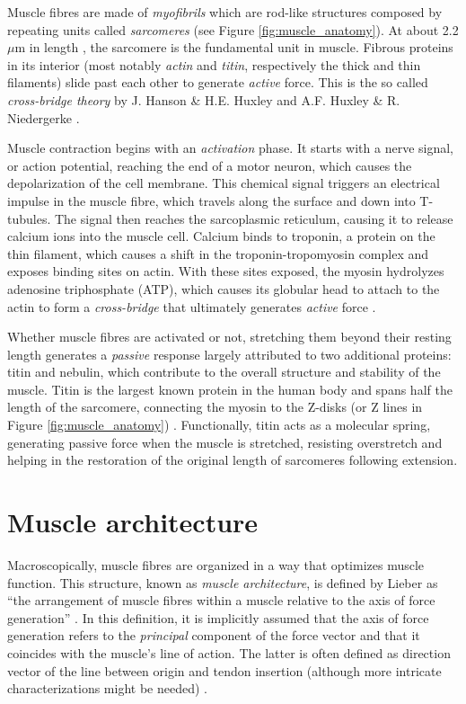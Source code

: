 \documentclass{sfuthesis}
\numberwithin{equation}{section}
\numberwithin{figure}{chapter}
\numberwithin{table}{chapter}
\theoremstyle{definition}
\begin{document}
Muscle fibres are made of \textit{myofibrils} which are rod-like structures composed by repeating units called \textit{sarcomeres} (see Figure \ref{fig:muscle_anatomy}). At about 2.2 $\mu$m in length \cite{burkholder2001sarcomere}, the sarcomere is the fundamental unit in muscle. Fibrous proteins in its interior (most notably \textit{actin} and \textit{titin}, respectively the thick and thin filaments) slide past each other to generate \textit{active} force. This is the so called \textit{cross-bridge theory} by J. Hanson \& H.E. Huxley \cite{HansonHuxley1953} and A.F. Huxley \& R. Niedergerke \cite{HuxleyNiedergerke1954}.

Muscle contraction begins with an \textit{activation} phase. It starts with a nerve signal, or action potential, reaching the end of a motor neuron, which causes the depolarization of the cell membrane. This chemical signal triggers an electrical impulse in the muscle fibre, which travels along the surface and down into T-tubules. The signal then reaches the sarcoplasmic reticulum, causing it to release calcium ions into the muscle cell. Calcium binds to troponin, a protein on the thin filament, which causes a shift in the troponin-tropomyosin complex and exposes binding sites on actin. With these sites exposed, the myosin hydrolyzes adenosine triphosphate (ATP), which causes its globular head to attach to the actin to form a \textit{cross-bridge} that ultimately generates \textit{active} force \cite{Ruegg2012Calcium}.

Whether muscle fibres are activated or not, stretching them beyond their resting length generates a \textit{passive} response largely attributed to two additional proteins: titin and nebulin, which contribute to the overall structure and stability of the muscle. Titin is the largest known protein in the human body and spans half the length of the sarcomere, connecting the myosin to the Z-disks (or Z lines in Figure \ref{fig:muscle_anatomy}) \cite{Nishikawa2020, Nishikawa2012WindingFilament}. Functionally, titin acts as a molecular spring, generating passive force when the muscle is stretched, resisting overstretch and helping in the restoration of the original length of sarcomeres following extension.

\section{Muscle architecture} \label{sec:intro_muscle_architecture}

Macroscopically, muscle fibres are organized in a way that optimizes muscle function. This structure, known as \textit{muscle architecture}, is defined by Lieber as ``the arrangement of muscle fibres within a muscle relative to the axis of force generation'' \cite{Lieber2010Book}. In this definition, it is implicitly assumed that the axis of force generation refers to the \textit{principal} component of the force vector and that it coincides with the muscle's line of action. The latter is often defined as direction vector of the line between origin and tendon insertion (although more intricate characterizations might be needed) \cite{Lee20153DPennation}.
\end{document}
